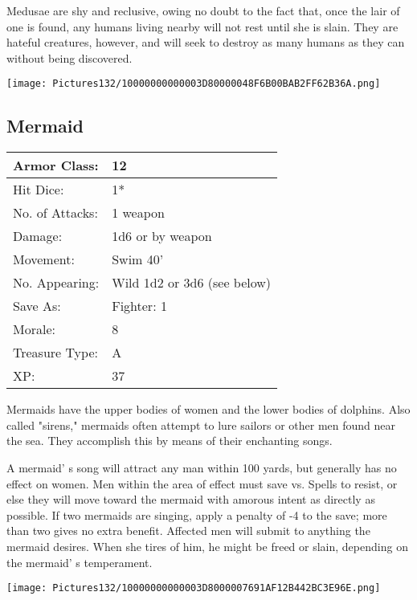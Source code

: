 \documentclass[a4paper,twoside,openany,10pt]{book}
\begin{document}
\begin{multicols}{2}
Medusae are shy and reclusive, owing no doubt to the fact that, once the lair of one is found, any humans living nearby will not rest until she is slain. They are hateful creatures, however, and will seek to destroy as many humans as they can without being discovered.

\begin{center} \texttt{[image: Pictures132/10000000000003D80000048F6B00BAB2FF62B36A.png]} \end{center}


\subsection*{Mermaid}\label{mermaid}

\begin{tabularx}{0.50\textwidth}{@{}lX@{}}
Armor Class: & 12 \\\hline
Hit Dice: & 1* \\\hline
No. of Attacks: & 1 weapon \\\hline
Damage: & 1d6 or by weapon \\\hline
Movement: & Swim 40' \\\hline
No. Appearing: & Wild 1d2 or 3d6 (see below) \\\hline
Save As: & Fighter: 1 \\\hline
Morale: & 8 \\\hline
Treasure Type: & A \\\hline
XP: & 37 \\\hline
\end{tabularx}\medskip

Mermaids have the upper bodies of women and the lower bodies of dolphins. Also called "sirens," mermaids often attempt to lure sailors or other men found near the sea. They accomplish this by means of their enchanting songs.

A mermaid' s song will attract any man within 100 yards, but generally has no effect on women. Men within the area of effect must save vs. Spells to resist, or else they will move toward the mermaid with amorous intent as directly as possible. If two mermaids are singing, apply a penalty of -4 to the save; more than two gives no extra benefit. Affected men will submit to anything the mermaid desires. When she tires of him, he might be freed or slain, depending on the mermaid' s temperament.


\begin{center} \texttt{[image: Pictures132/10000000000003D8000007691AF12B442BC3E96E.png]} \end{center}


\end{multicols}
\end{document}
